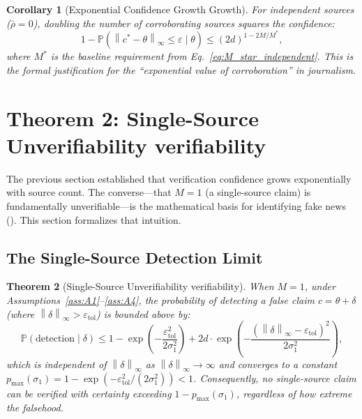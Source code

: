 \documentclass[11pt,a4paper]{article}
\newtheorem{theorem}{Theorem}[section]
\newtheorem{corollary}[theorem]{Corollary}
\theoremstyle{definition}
\newcommand{\Pbb}{\mathbb{P}}
\newcommand{\norm}[1]{\left\lVert#1\right\rVert}
\begin{document}
\begin{corollary}[Exponential Confidence Growth Growth]
\label{cor:exponential_growth}
For independent sources ($\bar{\rho} = 0$), doubling the number of corroborating sources squares the confidence:
\begin{equation}
    1 - \Pbb(\norm{c^* - \theta}_\infty \leq \varepsilon \mid \theta) \leq (2d)^{1 - 2M/M^*},
    \label{eq:exponential_growth}
\end{equation}
where $M^*$ is the baseline requirement from Eq.~\eqref{eq:M_star_independent}. This is the formal justification for the ``exponential value of corroboration'' in journalism.
\end{corollary}

\section{Theorem 2: Single-Source Unverifiability verifiability}
\label{sec:single_source}

The previous section established that verification confidence grows exponentially with source count. The converse---that $M = 1$ (a single-source claim) is fundamentally unverifiable---is the mathematical basis for identifying fake news (). This section formalizes that intuition.

\subsection{The Single-Source Detection Limit}

\begin{theorem}[Single-Source Unverifiability verifiability]
\label{thm:single_source}
When $M = 1$, under Assumptions~\ref{ass:A1}--\ref{ass:A4}, the probability of detecting a false claim $c = \theta + \delta$ (where $\norm{\delta}_\infty > \varepsilon_{\mathrm{tol}}$) is bounded above by:
\begin{equation}
    \Pbb(\text{detection} \mid \delta) \leq 1 - \exp\left(-\frac{\varepsilon_{\mathrm{tol}}^2}{2\sigma_1^2}\right) + 2d \cdot \exp\left(-\frac{(\norm{\delta}_\infty - \varepsilon_{\mathrm{tol}})^2}{2\sigma_1^2}\right),
    \label{eq:single_source_bound}
\end{equation}
which is independent of $\norm{\delta}_\infty$ as $\norm{\delta}_\infty \to \infty$ and converges to a constant $p_{\max}(\sigma_1) = 1 - \exp(-\varepsilon_{\mathrm{tol}}^2 / (2\sigma_1^2)) < 1$. Consequently, no single-source claim can be verified with certainty exceeding $1 - p_{\max}(\sigma_1)$, regardless of how extreme the falsehood.
\end{theorem}
\end{document}
